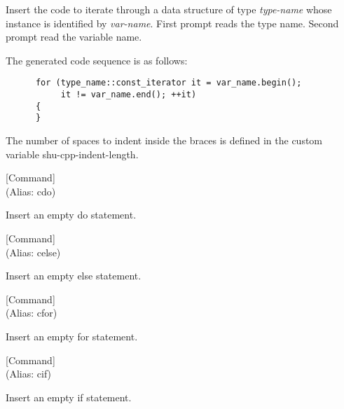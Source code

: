 \begin{doc-string}
Insert the code to iterate through a data structure of type \emph{type-name} whose
instance is identified by \emph{var-name}.  First prompt reads the type name.  Second
prompt read the variable name.

The generated code sequence is as follows:

\small{\begin{verbatim}
      for (type_name::const_iterator it = var_name.begin();
           it != var_name.end(); ++it)
      {
      }
\end{verbatim}}

The number of spaces to indent inside the braces is defined in the custom
variable shu-cpp-indent-length.
\end{doc-string}

\vspace{1em}
\noindent
{}
\usebox{\funcname}
 \hfill [Command]\\%
 (Alias: cdo)

\begin{doc-string}
Insert an empty do statement.
\end{doc-string}

\vspace{1em}
\noindent
{}
\usebox{\funcname}
 \hfill [Command]\\%
 (Alias: celse)

\begin{doc-string}
Insert an empty else statement.
\end{doc-string}

\vspace{1em}
\noindent
{}
\usebox{\funcname}
 \hfill [Command]\\%
 (Alias: cfor)

\begin{doc-string}
Insert an empty for statement.
\end{doc-string}

\vspace{1em}
\noindent
{}
\usebox{\funcname}
 \hfill [Command]\\%
 (Alias: cif)

\begin{doc-string}
Insert an empty if statement.
\end{doc-string}


